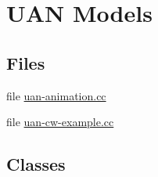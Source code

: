 \hypertarget{group__uan}{}\section{U\+AN Models}
\label{group__uan}
\subsection*{Files}
\begin{DoxyCompactItemize}
\item 
file \hyperlink{uan-animation_8cc}{uan-\/animation.\+cc}
\item 
file \hyperlink{uan-cw-example_8cc}{uan-\/cw-\/example.\+cc}
\end{DoxyCompactItemize}
\subsection*{Classes}

